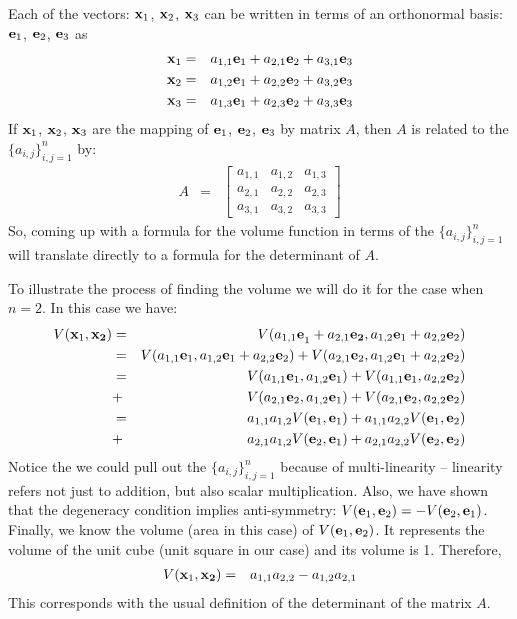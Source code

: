 \documentclass{article}
\begin{document}
Each of the vectors: ${\bf x}_1$, ${\bf x}_2$, ${\bf x}_3$ can be written in
terms of an orthonormal basis: ${\bf e}_1$, ${\bf e}_2$, ${\bf e}_3$ as
\begin{eqnarray*}
  {\bf x}_1 & = & a_{1,1} {\bf e}_1 + a_{2,1} {\bf e}_2 + a_{3,1} {\bf e}_3 \\
  {\bf x}_2 & = & a_{1,2} {\bf e}_1 + a_{2,2} {\bf e}_2 + a_{3,2} {\bf e}_3 \\
  {\bf x}_3 & = & a_{1,3} {\bf e}_1 + a_{2,3} {\bf e}_2 + a_{3,3} {\bf e}_3 \\
\end{eqnarray*}
If ${\bf x}_1$, ${\bf x}_2$, ${\bf x}_3$ are the mapping of
${\bf e}_1$, ${\bf e}_2$, ${\bf e}_3$ by matrix $A$, then $A$ is related to the
$\{a_{i,j}\}_{i,j=1}^n$ by:
\begin{eqnarray}
  A & = & \left[ \begin{array}{ccc}
                   a_{1,1} & a_{1, 2} & a_{1,3} \\
                   a_{2,1} & a_{2, 2} & a_{2,3} \\
                   a_{3,1} & a_{3, 2} & a_{3,3}
                 \end{array} \right]
\end{eqnarray}
So, coming up with a formula for the volume function in terms of the
$\{a_{i,j}\}_{i,j=1}^n$ will
translate directly to a formula for the determinant of $A$.

To illustrate the process of finding the volume we will do it for the case
when $n=2$.
In this case we have:
\begin{eqnarray*}
  V({\bf x}_1, {\bf x_2})
  & = & V({a_{1,1} \bf e}_1 + a_{2, 1} {\bf e_2}, a_{1, 2}{\bf e}_1 + a_{2, 2}{\bf e}_2) \\
  & = & V({a_{1,1} {\bf e}_1}, a_{1, 2}{\bf e}_1 + a_{2, 2}{\bf e}_2)
        + V({a_{2,1} {\bf e}_2}, a_{1, 2}{\bf e}_1 + a_{2, 2}{\bf e}_2) \\
  & = & V(a_{1,1} {\bf e}_1, a_{1,2}{\bf e}_1) + V(a_{1,1} {\bf e}_1, a_{2,2} {\bf e}_2) \\
  & + & V(a_{2,1} {\bf e}_2, a_{1,2}{\bf e}_1) + V(a_{2,1} {\bf e}_2, a_{2,2} {\bf e}_2) \\
  & = & a_{1,1} a_{1,2} V({\bf e}_1, {\bf e}_1) + a_{1,1}a_{2,2} V({\bf e}_1, {\bf e}_2) \\
  & + & a_{2,1} a_{1,2} V({\bf e}_2, {\bf e}_1) + a_{2,1} a_{2,2} V({\bf e}_2, {\bf e}_2)
\end{eqnarray*} 
Notice the we could pull out the $\{a_{i,j}\}_{i,j=1}^n$
because of multi-linearity -- linearity
refers not just to addition, but also scalar multiplication. 
Also, we have shown that the degeneracy condition implies anti-symmetry:
$V({\bf e}_1, {\bf e}_2) = - V({\bf e}_2, {\bf e}_1)$.
Finally, we know the volume (area in this case) of $V({\bf e}_1, {\bf e}_2)$. It
represents the volume of the unit cube (unit square in our case) and its volume is 1.
Therefore,
\begin{eqnarray}
  V({\bf x}_1, {\bf x_2}) & = & a_{1,1} a_{2,2} - a_{1,2} a_{2,1}
\end{eqnarray}
This corresponds with the usual definition of the determinant of the matrix $A$.
\end{document}
